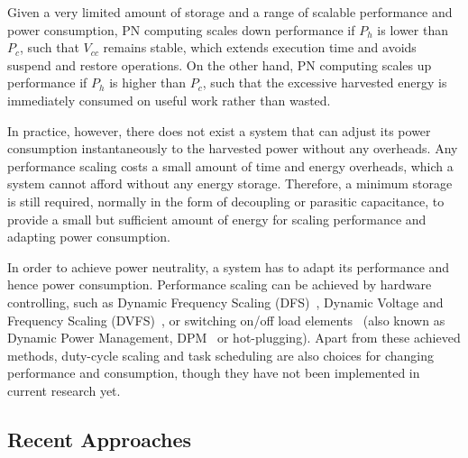 Given a very limited amount of storage and a range of scalable performance and power consumption, PN computing scales down performance if $P_h$ is lower than $P_c$, such that $V_{cc}$ remains stable, which extends execution time and avoids suspend and restore operations. On the other hand, PN computing scales up performance if $P_h$ is higher than $P_c$, such that the excessive harvested energy is immediately consumed on useful work rather than wasted.

In practice, however, there does not exist a system that can adjust its power consumption instantaneously to the harvested power without any overheads. Any performance scaling costs a small amount of time and energy overheads, which a system cannot afford without any energy storage. Therefore, a minimum storage is still required, normally in the form of decoupling or parasitic capacitance, to provide a small but sufficient amount of energy for scaling performance and adapting power consumption.

In order to achieve power neutrality, a system has to adapt its performance and hence power consumption. Performance scaling can be achieved by hardware controlling, such as Dynamic Frequency Scaling (DFS)~\cite{balsamo2016graceful}, Dynamic Voltage and Frequency Scaling (DVFS)~\cite{fletcher2017power}, or switching on/off load elements~\cite{wang2016storage, fletcher2017power} (also known as Dynamic Power Management, DPM~\cite{lu2000low} or hot-plugging). Apart from these achieved methods, duty-cycle scaling and task scheduling are also choices for changing performance and consumption, though they have not been implemented in current research yet.

\subsection{Recent Approaches}

